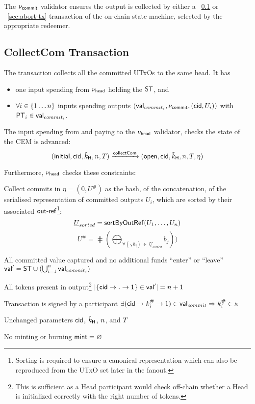 \noindent The $\nu_\mathsf{commit}$ validator ensures the output is collected by either a \mtxCCom{}~\ref{sec:collect-tx} or \mtxAbort{}~\ref{sec:abort-tx} transaction of the on-chain state machine, selected by the appropriate redeemer.

\subsection{CollectCom Transaction}\label{sec:collect-tx}



\noindent The \mtxCCom{} transaction collects all the committed UTxOs to the same head. It has
\begin{itemize}
  \item one input spending from $\nu_\mathsf{head}$ holding the $\mathsf{ST}$, and
  \item $\forall i \in \{1 \dots n\}$ inputs spending \mtxCom{} outputs $(\mathsf{val}_{commit_i}, \nu_\mathsf{commit}, (\mathsf{cid}, U_{i}))$ with $\mathsf{PT}_{i} \in \mathsf{val}_{commit_{i}}$.
\end{itemize}
The input spending from and paying to the $\nu_\mathsf{head}$ validator, checks the state
of the CEM is advanced:
\[
   (\mathsf{initial},\mathsf{cid},\tilde{k}_{\mathsf{H}},n,T) \xrightarrow{\mathsf{collectCom}} (\mathsf{open},\mathsf{cid},\tilde{k}_{\mathsf{H}},n,T,\eta)
\]

\noindent Furthermore, $\nu_\mathsf{head}$ checks these constraints:
\begin{menumerate}
  \item Collect commits in $\eta = (0, U^{\#})$ as the hash, of the concatenation, of
  the serialised representation of committed outputs $U_{i}$, which are sorted by their associated $\mathsf{out\textsf{-}{}ref}$\footnote{Sorting is required to ensure a canonical representation which can also be reproduced from the UTxO set later in the fanout.}:  
  \[
    \underline{U}_{sorted} = \mathsf{sortByOutRef} ( U_{1}, \dots, U_{n} )
  \]
  \[
    U^{\#} = \hash(\bigoplus_{\forall (\cdot, b_{j})~\in~\underline{U}_{sorted}} b_{j}))
  \]
  \item All committed value captured and no additional funds ``enter'' or ``leave''\\
  $\mathsf{val}' = \mathsf{ST} \cup (\bigcup_{i=1}^{n} \mathsf{val}_{commit_i})$
  \item All tokens present in output\footnote{This is sufficient as a Head participant would check off-chain whether a Head is initialized correctly with the right number of tokens.}
  $|\{\mathsf{cid} \rightarrow . \rightarrow 1\} \in \mathsf{val}'| = n + 1$
  \item Transaction is signed by a participant $\exists (\mathsf{cid} \rightarrow k^{\#}_{i} \rightarrow 1) \in \mathsf{val}_{commit} \Rightarrow k^{\#}_{i} \in \kappa$
  \item Unchanged parameters $\mathsf{cid}$, $\tilde{k}_{\mathsf{H}}$, $n$, and
  $T$ 
  \item No minting or burning  $\mathsf{mint} = \varnothing$
\end{menumerate}


